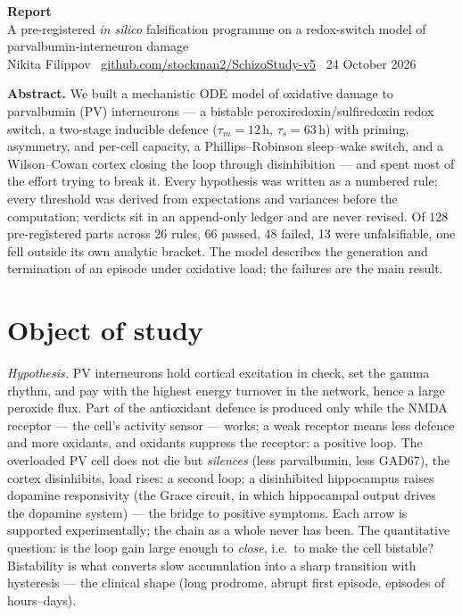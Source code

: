 \documentclass[11pt,a4paper]{article}
\theoremstyle{remark}
\begin{document}
\begin{center}
{\large\bfseries Report}\\[2pt]
{\small A pre-registered \emph{in silico} falsification programme on a redox-switch model
of parvalbumin-interneuron damage}\\[2pt]
{\small Nikita Filippov \textperiodcentered\
\href{https://github.com/stockman2/SchizoStudy-v5}{github.com/stockman2/SchizoStudy-v5}
\textperiodcentered\ 24 October 2026}
\end{center}
\vspace{-4pt}

\noindent\textbf{Abstract.} We built a mechanistic ODE model of oxidative damage to
parvalbumin (PV) interneurons --- a bistable peroxiredoxin/sulfiredoxin redox switch, a
two-stage inducible defence ($\tau_m=12$\,h, $\tau_s=63$\,h) with priming, asymmetry, and
per-cell capacity, a Phillips--Robinson sleep--wake switch, and a Wilson--Cowan cortex
closing the loop through disinhibition --- and spent most of the effort trying to break
it. Every hypothesis was written as a numbered rule; every threshold was derived from
expectations and variances before the computation; verdicts sit in an append-only
ledger and are never revised. Of 128 pre-registered parts across 26 rules, 66 passed,
48 failed, 13 were unfalsifiable, one fell outside its own analytic bracket. The model
describes the generation and termination of an episode under oxidative load; the
failures are the main result.

\section{Object of study}\label{sec:intro}
\emph{Hypothesis.} PV interneurons hold cortical excitation in check, set the gamma
rhythm, and pay with the highest energy turnover in the network, hence a large peroxide
flux. Part of the antioxidant defence is produced only while the NMDA receptor --- the
cell's activity sensor --- works; a weak receptor means less defence and more oxidants,
and oxidants suppress the receptor: a positive loop. The overloaded PV cell does not die
but \emph{silences} (less parvalbumin, less GAD67), the cortex disinhibits, load rises:
a second loop; a disinhibited hippocampus raises dopamine responsivity (the Grace
circuit, in which hippocampal output drives the dopamine system) --- the bridge to
positive symptoms. Each arrow is supported experimentally; the chain as a
whole never has been. The quantitative question: is the loop gain large enough to
\emph{close}, i.e.\ to make the cell bistable? Bistability is what converts slow
accumulation into a sharp transition with hysteresis --- the clinical shape (long
prodrome, abrupt first episode, episodes of hours--days).
\end{document}
